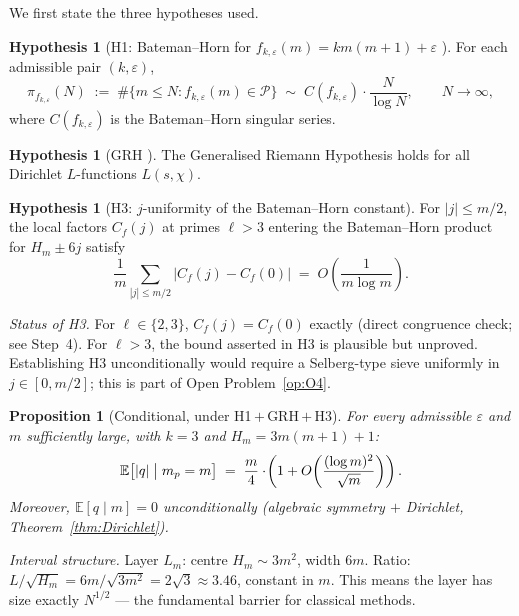 \documentclass[11pt,a4paper]{article}
\newtheorem{proposition}[theorem]{Proposition}
\theoremstyle{definition}
\newtheorem{hypothesis}[theorem]{Hypothesis}
\theoremstyle{remark}
\newcommand{\E}{\mathbb{E}}
\newcommand{\eps}{\varepsilon}
\begin{document}
We first state the three hypotheses used.

\begin{hypothesis}[H1: Bateman--Horn for
$f_{k,\eps}(m)=km(m+1)+\eps$ \cite{BatemanHorn1962}]\label{H1}
For each admissible pair $(k,\eps)$,
\[
  \pi_{f_{k,\eps}}(N)\;:=\;\#\{m\le N:f_{k,\eps}(m)\in\mathcal{P}\}
   \;\sim\;C(f_{k,\eps})\cdot\frac{N}{\log N},\qquad N\to\infty,
\]
where $C(f_{k,\eps})$ is the Bateman--Horn singular series.
\end{hypothesis}

\begin{hypothesis}[GRH \cite{Davenport2000}]\label{GRH}
The Generalised Riemann Hypothesis holds for all Dirichlet
$L$-functions $L(s,\chi)$.
\end{hypothesis}

\begin{hypothesis}[H3: $j$-uniformity of the Bateman--Horn
constant]\label{H3}
For $|j|\le m/2$, the local factors $C_{f}(j)$ at primes
$\ell>3$ entering the Bateman--Horn product for $H_{m}\pm 6j$ satisfy
\[
  \frac{1}{m}\sum_{|j|\le m/2}\bigl|C_{f}(j)-C_{f}(0)\bigr|
   \;=\;O\!\left(\frac{1}{m\log m}\right).
\]
\end{hypothesis}

\noindent\emph{Status of \textup{H3}.} For $\ell\in\{2,3\}$,
$C_{f}(j)=C_{f}(0)$ exactly (direct congruence check; see Step~4).
For $\ell>3$, the bound asserted in \textup{H3} is plausible but
unproved. Establishing \textup{H3} unconditionally would require a
Selberg-type sieve uniformly in $j\in[0,m/2]$; this is part of
Open Problem~\ref{op:O4}.

\begin{heuristicbox}
\begin{proposition}[Conditional, under
H1\,$+$\,GRH\,$+$\,H3]\label{prop:cond-m4}
For every admissible $\eps$ and $m$ sufficiently large, with $k=3$
and $H_{m}=3m(m+1)+1$:
\[
  \E\bigl[|q|\bigm|m_{p}=m\bigr]
  \;=\;\frac{m}{4}\cdot\!\left(1+O\!\left(\frac{(\log m)^{2}}{\sqrt{m}}\right)\right).
\]
Moreover, $\E[q\mid m]=0$ unconditionally (algebraic symmetry $+$
Dirichlet, Theorem~\ref{thm:Dirichlet}).
\end{proposition}
\end{heuristicbox}

\smallskip
\noindent\emph{Interval structure.} Layer $L_{m}$: centre
$H_{m}\sim 3m^{2}$, width $6m$. Ratio:
$L/\sqrt{H_{m}}=6m/\sqrt{3m^{2}}=2\sqrt{3}\approx 3.46$, constant in
$m$. This means the layer has size exactly $N^{1/2}$ --- the
fundamental barrier for classical methods.
\end{document}
